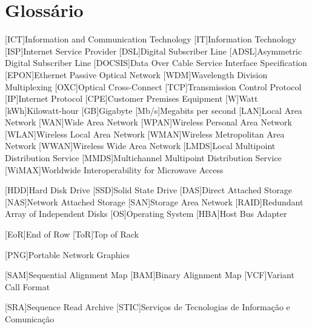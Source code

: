 \chapter{Glossário}

\footnotesize
\SingleSpacing

\begin{multicols}{2}
\begin{acronym}[AAAAAA]


	[ICT]{Information and Communication Technology}
	[IT]{Information Technology}
	[ISP]{Internet Service Provider}
	[DSL]{Digital Subscriber Line}
	[ADSL]{Asymmetric Digital Subscriber Line}
	[DOCSIS]{Data Over Cable Service Interface Specification}
	[EPON]{Ethernet Passive Optical Network}
	[WDM]{Wavelength Division Multiplexing}
	[OXC]{Optical Cross-Connect}
	[TCP]{Transmission Control Protocol}
	[IP]{Internet Protocol}
	[CPE]{Customer Premises Equipment}
	{Watt}
	[kWh]{Kilowatt-hour}
	[GB]{Gigabyte}
	[Mb/s]{Megabits per second}
	[LAN]{Local Area Network}
	[WAN]{Wide Area Network}
	[WPAN]{Wireless Personal Area Network}
	[WLAN]{Wireless Local Area Network}
	[WMAN]{Wireless Metropolitan Area Network}
	[WWAN]{Wireless Wide Area Network}
	[LMDS]{Local Multipoint Distribution Service}
	[MMDS]{Multichannel Multipoint Distribution Service}
	[WiMAX]{Worldwide Interoperability for Microwave Access}

	[HDD]{Hard Disk Drive}
	[SSD]{Solid State Drive}
	[DAS]{Direct Attached Storage}
	[NAS]{Network Attached Storage}
	[SAN]{Storage Area Network}
	[RAID]{Redundant Array of Independent Disks}
	[OS]{Operating System}
	[HBA]{Host Bus Adapter}

	[EoR]{End of Row}
	[ToR]{Top of Rack}

	[PNG]{Portable Network Graphics}

	[SAM]{Sequential Alignment Map}
	[BAM]{Binary Alignment Map}
	[VCF]{Variant Call Format}

	[SRA]{Sequence Read Archive}
	[STIC]{Serviços de Tecnologias de Informação e Comunicação}


\end{acronym}
\end{multicols}

